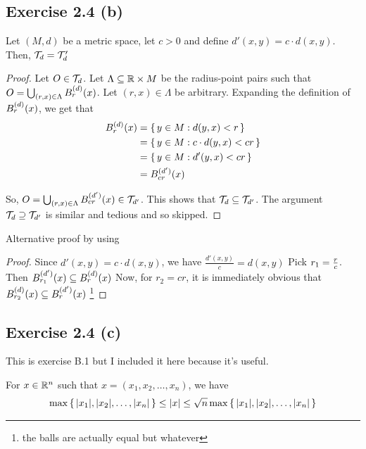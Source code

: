 \documentclass{article}
\begin{document}
\subsection{Exercise 2.4 (b)}
\begin{claim}
Let $(M, d)$ be a metric space, let $c > 0$ and define $d'(x, y) = c \cdot d(x, y)$. 
Then, $\mathcal{T}_d = \mathcal{T}_d'$
\end{claim}

\begin{proof}
Let $O \in \mathcal{T}_{d}$. Let $\Lambda \subseteq \mathbb{R} \times M$ be the radius-point pairs
such that $O = \bigcup_{(r, x) \in \Lambda}  B_{r}^{(d)} (x) $.
Let $(r, x) \in \Lambda$ be arbitrary. Expanding the definition of $ B_{r}^{(d)} (x) $, we
get that 
\begin{align*}
     B_{r}^{(d)} (x)  &= \set{y \in M: d(y, x) < r} \\
    &= \set{y \in M:  c \cdot d(y, x) < cr} \\
    &= \set{y \in M:  d'(y, x) < cr} \\
    &=  B_{cr}^{(d')} (x) 
\end{align*}

So, $O = \bigcup_{(r, x) \in \Lambda}  B_{cr}^{(d')} (x)  \in \mathcal{T}_{d'}$. 
This shows that $\mathcal{T}_{d} \subseteq \mathcal{T}_{d'}$. The argument
$\mathcal{T}_{d} \supseteq \mathcal{T}_{d'}$ is similar and tedious and so skipped.
\end{proof}

Alternative proof by using 
\begin{proof}
    Since $d'(x, y) = c \cdot d(x, y)$, we have $\frac{d'(x, y)}{c} = d(x, y)$
    Pick $r_1 = \f r/c.$. Then $ B_{r_1}^{(d')} (x)  \subseteq  B_{r}^{(d)} (x) $
    Now, for $r_2 = cr$, it is immediately obvious that $ B_{r_2}^{(d)} (x)  \subseteq  B_{r}^{(d')} (x) $ \footnote{the balls are actually equal but whatever}
\end{proof}

\subsection{Exercise 2.4 (c)}

This is exercise B.1 but I included it here because it's useful.
\begin{lemma}
\label{lemma:exb.1}
For $x \in \mathbb{R}^n$ such that $x = (x_1, x_2, \dots, x_n)$, we have
\begin{align*}
\max\set{\lvert x_1 \rvert, \lvert x_2 \rvert, \dots, \lvert x_n \rvert} \leq \lvert x \rvert \leq \sqrt n \max\set{\lvert x_1 \rvert, \lvert x_2 \rvert, \dots, \lvert x_n \rvert}
\end{align*}

\end{lemma}
\end{document}
